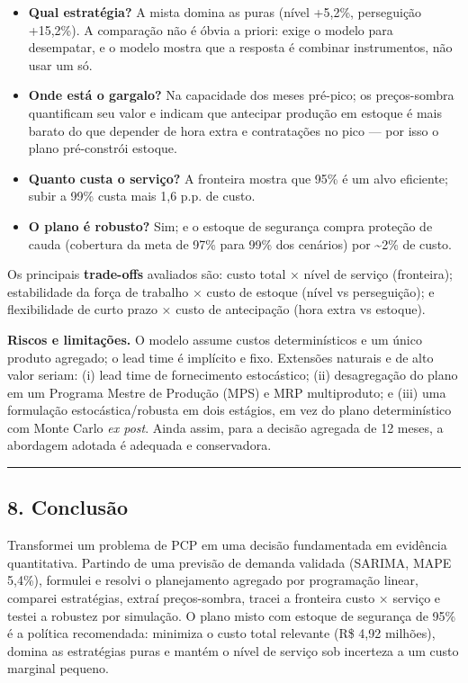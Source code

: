 \documentclass[
  brazilian,
  12pt,
]{article}
\providecommand{\tightlist}{%
  \setlength{\itemsep}{0pt}\setlength{\parskip}{0pt}}
\begin{document}
\begin{itemize}
\tightlist
\item
  \textbf{Qual estratégia?} A mista domina as puras (nível +5,2\%,
  perseguição +15,2\%). A comparação não é óbvia a priori: exige o
  modelo para desempatar, e o modelo mostra que a resposta é combinar
  instrumentos, não usar um só.
\item
  \textbf{Onde está o gargalo?} Na capacidade dos meses pré-pico; os
  preços-sombra quantificam seu valor e indicam que antecipar produção
  em estoque é mais barato do que depender de hora extra e contratações
  no pico --- por isso o plano pré-constrói estoque.
\item
  \textbf{Quanto custa o serviço?} A fronteira mostra que 95\% é um alvo
  eficiente; subir a 99\% custa mais 1,6 p.p. de custo.
\item
  \textbf{O plano é robusto?} Sim; e o estoque de segurança compra
  proteção de cauda (cobertura da meta de 97\% para 99\% dos cenários)
  por \textasciitilde2\% de custo.
\end{itemize}

Os principais \textbf{trade-offs} avaliados são: custo total × nível de
serviço (fronteira); estabilidade da força de trabalho × custo de
estoque (nível vs perseguição); e flexibilidade de curto prazo × custo
de antecipação (hora extra vs estoque).

\textbf{Riscos e limitações.} O modelo assume custos determinísticos e
um único produto agregado; o lead time é implícito e fixo. Extensões
naturais e de alto valor seriam: (i) lead time de fornecimento
estocástico; (ii) desagregação do plano em um Programa Mestre de
Produção (MPS) e MRP multiproduto; e (iii) uma formulação
estocástica/robusta em dois estágios, em vez do plano determinístico com
Monte Carlo \emph{ex post}. Ainda assim, para a decisão agregada de 12
meses, a abordagem adotada é adequada e conservadora.

\begin{center}\rule{0.5\linewidth}{0.5pt}\end{center}

\subsection{8. Conclusão}\label{conclusuxe3o}

Transformei um problema de PCP em uma decisão fundamentada em evidência
quantitativa. Partindo de uma previsão de demanda validada (SARIMA, MAPE
5,4\%), formulei e resolvi o planejamento agregado por programação
linear, comparei estratégias, extraí preços-sombra, tracei a fronteira
custo × serviço e testei a robustez por simulação. O plano misto com
estoque de segurança de 95\% é a política recomendada: minimiza o custo
total relevante (R\$ 4,92 milhões), domina as estratégias puras e mantém
o nível de serviço sob incerteza a um custo marginal pequeno.
\end{document}
